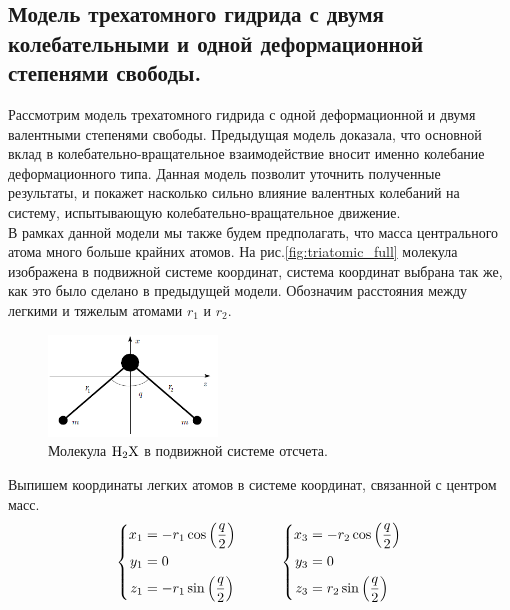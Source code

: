 \subsection{Модель трехатомного гидрида с двумя колебательными и одной деформационной степенями свободы.}

Рассмотрим модель трехатомного гидрида с одной деформационной и двумя валентными степенями свободы. Предыдущая модель доказала, что основной вклад в колебательно-вращательное взаимодействие вносит именно колебание деформационного типа. Данная модель позволит уточнить полученные результаты, и покажет насколько сильно влияние валентных колебаний на систему, испытывающую колебательно-вращательное движение. \\
В рамках данной модели мы также будем предполагать, что масса центрального атома много больше крайних атомов. На рис.\eqref{fig:triatomic_full} молекула изображена в подвижной системе координат, система координат выбрана так же, как это было сделано в предыдущей модели. Обозначим расстояния между легкими и тяжелым атомами $r_1$ и $r_2$.

\begin{figure}[H]
  \centering
	\includegraphics[width=0.4\textwidth]{../pictures/triatomic_full.png}
	\caption{Молекула $\ce{H2X}$ в подвижной системе отсчета.}
	\label{fig:triatomic_full}
\end{figure}

Выпишем координаты легких атомов в системе координат, связанной с центром масс.
\vverh
\begin{gather}
\left\{
\begin{aligned}
x_1 &= - r_1 \cos \left( \frac{q}{2} \right) \\
y_1 &= 0 \\
z_1 &= - r_1 \sin \left( \frac{q}{2} \right) 
\end{aligned}
\right. \quad \quad \quad
\left\{
\begin{aligned}
x_3 &= - r_2 \cos \left( \frac{q}{2} \right) \\
y_3 &= 0 \\
z_3 &= r_2 \sin \left( \frac{q}{2} \right)
\end{aligned}
\right.\notag
\end{gather}

